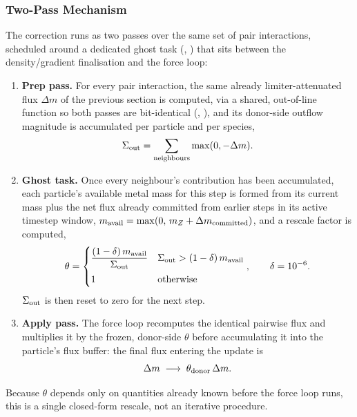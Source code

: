 \subsubsection{Two-Pass Mechanism}
The correction runs as two passes over the same set of pair interactions,
scheduled around a dedicated ghost task
(, ) that sits
between the density/gradient finalisation and the force loop:
\begin{enumerate}
  \item \textbf{Prep pass.} For every pair interaction, the same
        already limiter-attenuated flux $\Delta m$ of the previous section
        is computed, via a shared, out-of-line function so both passes are
        bit-identical (,
        ), and its donor-side outflow magnitude is
        accumulated per particle and per species,
        \begin{equation}
          \label{eq:fct-sum}
          \Sigma_{\rm out} = \sum_{\rm neighbours} \max(0, -\Delta m) .
        \end{equation}
  \item \textbf{Ghost task.} Once every neighbour's contribution has been
        accumulated, each particle's available metal mass for this step is
        formed from its current mass plus the net flux already committed
        from earlier steps in its active timestep window,
        $m_{\rm avail} = \max(0,\, m_Z + \Delta m_{\rm committed})$, and a
        rescale factor is computed,
        \begin{equation}
          \label{eq:fct-theta}
          \theta = \begin{cases}
            \dfrac{(1-\delta)\, m_{\rm avail}}{\Sigma_{\rm out}} & \Sigma_{\rm out} > (1-\delta)\, m_{\rm avail} \\[0.8em]
            1 & \text{otherwise}
          \end{cases} , \qquad \delta = 10^{-6} .
        \end{equation}
        $\Sigma_{\rm out}$ is then reset to zero for the next step.
  \item \textbf{Apply pass.} The force loop recomputes the identical
        pairwise flux and multiplies it by the frozen, donor-side $\theta$
        before accumulating it into the particle's flux buffer: the final
        flux entering the update is
        \begin{equation}
          \Delta m \;\longrightarrow\; \theta_{\rm donor}\, \Delta m .
        \end{equation}
\end{enumerate}
Because $\theta$ depends only on quantities already known before the force
loop runs, this is a single closed-form rescale, not an iterative
procedure.

